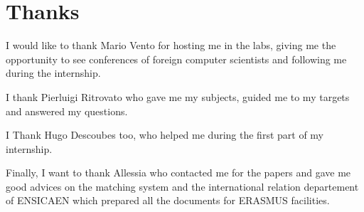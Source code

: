 \chapter*{Thanks}
\par I would like to thank Mario Vento for hosting me in the labs, giving me the opportunity to see conferences of foreign computer scientists and following me during the internship.	
\par I thank Pierluigi Ritrovato who gave me my subjects, guided me to my targets and answered my questions.
\par I Thank Hugo Descoubes too, who helped me during the first part of my internship. 
\par Finally, I want to thank Allessia who contacted me for the papers and gave me good advices on the matching system and the international relation departement of ENSICAEN which prepared all the documents for ERASMUS facilities.
